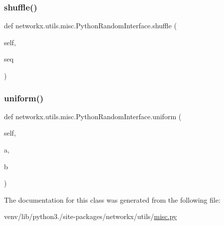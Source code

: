 \subsubsection{\texorpdfstring{shuffle()}{shuffle()}}
{\footnotesize\ttfamily def networkx.\+utils.\+misc.\+Python\+Random\+Interface.\+shuffle (\begin{DoxyParamCaption}\item[{}]{self,  }\item[{}]{seq }\end{DoxyParamCaption})}

\mbox{\label{classnetworkx_1_1utils_1_1misc_1_1PythonRandomInterface_a4a8d8e0e28851c85f4d90e3f18292dad}} 
\subsubsection{\texorpdfstring{uniform()}{uniform()}}
{\footnotesize\ttfamily def networkx.\+utils.\+misc.\+Python\+Random\+Interface.\+uniform (\begin{DoxyParamCaption}\item[{}]{self,  }\item[{}]{a,  }\item[{}]{b }\end{DoxyParamCaption})}



The documentation for this class was generated from the following file\+:\begin{DoxyCompactItemize}
\item 
venv/lib/python3./site-\/packages/networkx/utils/\hyperlink{networkx_2utils_2misc_8py}{misc.\+py}\end{DoxyCompactItemize}
